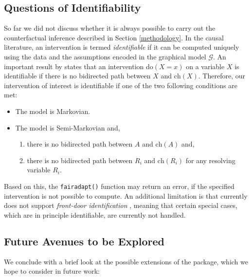 \documentclass[
  nojss]{jss}
\providecommand{\tightlist}{%
  \setlength{\itemsep}{0pt}\setlength{\parskip}{0pt}}
\begin{document}
\hypertarget{questions-of-identifiability}{%
\subsection{Questions of
Identifiability}\label{questions-of-identifiability}}

So far we did not discuss whether it is always possible to carry out the
counterfactual inference described in Section \ref{methodology}. In the
causal literature, an intervention is termed \emph{identifiable} if it
can be computed uniquely using the data and the assumptions encoded in
the graphical model \(\mathcal{G}\). An important result by
\cite{tian2002general} states that an intervention do\((X = x)\) on a
variable \(X\) is identifiable if there is no bidirected path between
\(X\) and \(\mathrm{ch}(X)\). Therefore, our intervention of interest is
identifiable if one of the two following conditions are met:

\begin{itemize}
\tightlist
\item
  The model is Markovian.
\item
  The model is Semi-Markovian and,

  \begin{enumerate}
  \def\labelenumi{(\roman{enumi})}
  \tightlist
  \item
    there is no bidirected path between \(A\) and \(\mathrm{ch}(A)\)
    and,
  \item
    there is no bidirected path between \(R_i\) and \(\mathrm{ch}(R_i)\)
    for any resolving variable \(R_i\).
  \end{enumerate}
\end{itemize}

Based on this, the \texttt{fairadapt()} function may return an error, if
the specified intervention is not possible to compute. An additional
limitation is that  currently does not support
\emph{front-door identification} \citep[Chapter~3]{pearl2009causality},
meaning that certain special cases, which are in principle identifiable,
are currently not handled.

\hypertarget{future-avenues-to-be-explored}{%
\subsection{Future Avenues to be
Explored}\label{future-avenues-to-be-explored}}

We conclude with a brief look at the possible extensions of the
 package, which we hope to consider in future work:
\end{document}
